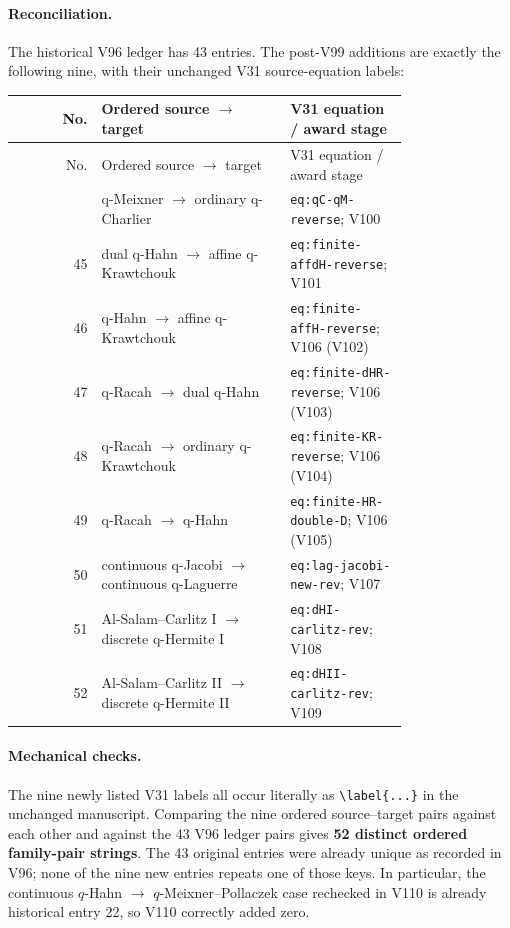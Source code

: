 \documentclass[11pt]{article}
\begin{document}
\paragraph{Reconciliation.} The historical V96 ledger has 43 entries. The post-V99 additions are exactly the following nine, with their unchanged V31 source-equation labels:
\begin{center}\small
\begin{longtable}{@{}r p{0.48\linewidth} p{0.30\linewidth}@{}}
\toprule No. & Ordered source $\to$ target & V31 equation / award stage\\
\midrule\endfirsthead
\toprule No. & Ordered source $\to$ target & V31 equation / award stage\\
\midrule\endhead
\bottomrule\endfoot
44 & q-Meixner $\to$ ordinary q-Charlier & \texttt{eq:qC-qM-reverse}; V100 \\
45 & dual q-Hahn $\to$ affine q-Krawtchouk & \texttt{eq:finite-affdH-reverse}; V101 \\
46 & q-Hahn $\to$ affine q-Krawtchouk & \texttt{eq:finite-affH-reverse}; V106 (V102) \\
47 & q-Racah $\to$ dual q-Hahn & \texttt{eq:finite-dHR-reverse}; V106 (V103) \\
48 & q-Racah $\to$ ordinary q-Krawtchouk & \texttt{eq:finite-KR-reverse}; V106 (V104) \\
49 & q-Racah $\to$ q-Hahn & \texttt{eq:finite-HR-double-D}; V106 (V105) \\
50 & continuous q-Jacobi $\to$ continuous q-Laguerre & \texttt{eq:lag-jacobi-new-rev}; V107 \\
51 & Al-Salam--Carlitz I $\to$ discrete q-Hermite I & \texttt{eq:dHI-carlitz-rev}; V108 \\
52 & Al-Salam--Carlitz II $\to$ discrete q-Hermite II & \texttt{eq:dHII-carlitz-rev}; V109 \\
\end{longtable}\end{center}
\paragraph{Mechanical checks.} The nine newly listed V31 labels all occur literally as \texttt{\textbackslash label\{...\}} in the unchanged manuscript. Comparing the nine ordered source--target pairs against each other and against the 43 V96 ledger pairs gives \textbf{52 distinct ordered family-pair strings}. The 43 original entries were already unique as recorded in V96; none of the nine new entries repeats one of those keys. In particular, the continuous $q$-Hahn $\to$ $q$-Meixner--Pollaczek case rechecked in V110 is already historical entry 22, so V110 correctly added zero.
\end{document}
